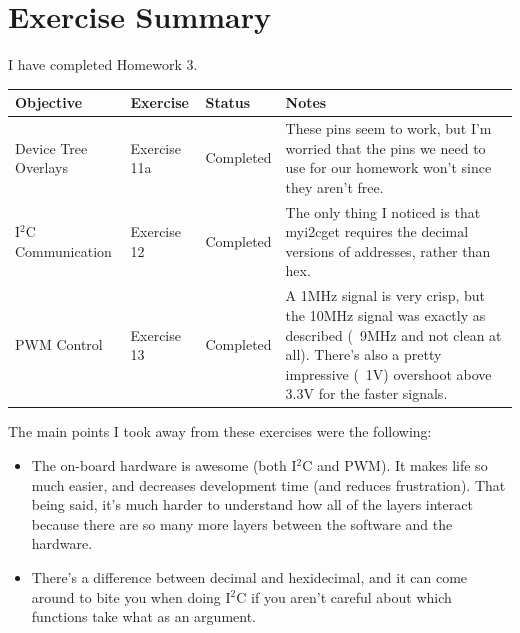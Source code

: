 \documentclass[letterpaper,10pt]{texMemo}
\begin{document}
\maketitle

\section{Exercise Summary}

\noindent I have completed Homework 3.

\begin{center}
\begin{tabular}{|p{4cm}|l|l|p{8cm}|}
\hline
\textbf{Objective} & \textbf{Exercise} &\textbf{Status} & \textbf{Notes}\\
\hline
Device Tree Overlays & Exercise 11a & Completed & These pins seem to work, but
I'm worried that the pins we need to use for our homework won't since they
aren't free.\\
\hline
I$^2$C Communication & Exercise 12 & Completed & The only thing I noticed is
that myi2cget requires the decimal versions of addresses, rather than hex.\\
\hline
PWM Control & Exercise 13 & Completed & A 1MHz signal is very crisp, but the
10MHz signal was exactly as described (~9MHz and not clean at all). There's also
a pretty impressive (~1V) overshoot above 3.3V for the faster signals.\\
\hline
\end{tabular}
\end{center}

\noindent The main points I took away from these exercises were the following:
\begin{itemize}
 \item The on-board hardware is awesome (both I$^2$C and PWM). It makes life so
much easier, and decreases development time (and reduces frustration). That
being said, it's much harder to understand how all of the layers interact
because there are so many more layers between the software and the hardware.
 \item There's a difference between decimal and hexidecimal, and it can come
around to bite you when doing I$^2$C if you aren't careful about which
functions take what as an argument.
\end{itemize}
\end{document}
